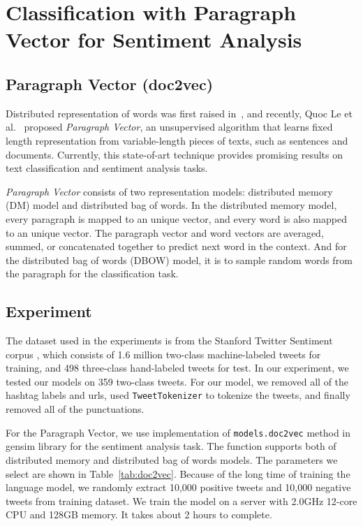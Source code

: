 \section{Classification with Paragraph Vector for Sentiment Analysis}\label{sec.doc2vec}

\subsection{Paragraph Vector (doc2vec)}
Distributed representation of words was first raised in~\cite{rumelhart1988}, and recently, Quoc Le et al.~\cite{le2014} proposed {\textit{Paragraph Vector}}, an unsupervised algorithm that learns fixed length representation from variable-length pieces of texts, such as sentences and documents. Currently, this state-of-art technique provides promising results on text classification and sentiment analysis tasks.

{\textit{Paragraph Vector}} consists of two representation models: distributed memory (DM) model and distributed bag of words. In the distributed memory model, every paragraph is mapped to an unique vector, and every word is also mapped to an unique vector. The paragraph vector and word vectors are averaged, summed, or concatenated together to predict next word in the context. And for the distributed bag of words (DBOW) model, it is to sample random words from the paragraph for the classification task.


\subsection{Experiment}
The dataset used in the experiments is from the Stanford Twitter Sentiment corpus \cite{go2009}, which consists of 1.6 million two-class machine-labeled tweets for training, and 498 three-class hand-labeled tweets for test. In our experiment, we tested our models on 359 two-class tweets. For our model, we removed all of the hashtag labels and urls, used {\tt TweetTokenizer} to tokenize the tweets, and finally removed all of the punctuations. 

For the Paragraph Vector, we use implementation of {\tt models.doc2vec} method in gensim library for the sentiment analysis task. The function supports both of distributed memory and distributed bag of words models. The parameters we select are shown in Table~\ref{tab:doc2vec}. Because of the long time of training the language model, we randomly extract 10,000 positive tweets and 10,000 negative tweets from training dataset. We train the model on a server with 2.0GHz 12-core CPU and 128GB memory. It takes about 2 hours to complete.

